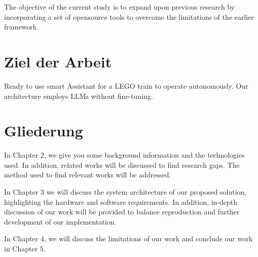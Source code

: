 The objective of the current study is to expand upon previous research by incorporating a set of opensource tools to overcome the limitations of the earlier framework. 

%
%
\section{Ziel der Arbeit}
\label{sec:intro:goal}
Ready to use smart Assistant for a LEGO train to operate autonomously.
Our architecture employs LLMs without fine-tuning.

%
%
\section{Gliederung}
\label{sec:intro:structure}
In Chapter 2, we give you some background information and the technologies used. In addition, related works will be discussed to find research gaps.
The method used to find relevant works will be addressed.

In Chapter 3 we will discuss the system architecture of our proposed solution, highlighting the hardware and software requirements. In addition, in-depth discussion of our work will be provided to balance reproduction and further development of our implementation.

In Chapter 4, we will discuss the limitations of our work and conclude our work in Chapter 5.